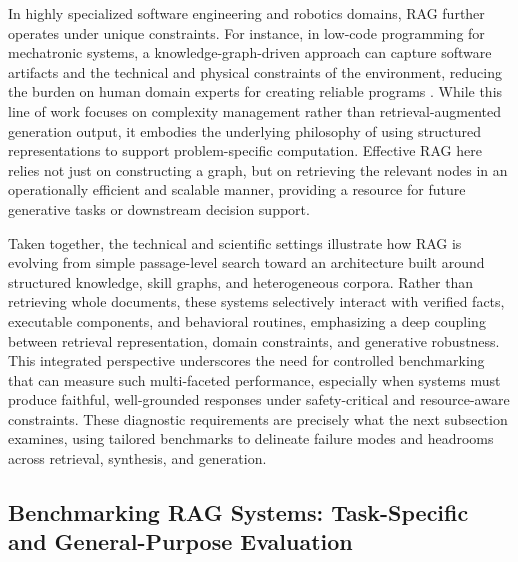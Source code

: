 \documentclass[11pt]{article}
\begin{document}
In highly specialized software engineering and robotics domains, RAG further operates under unique constraints. For instance, in low-code programming for mechatronic systems, a knowledge-graph-driven approach can capture software artifacts and the technical and physical constraints of the environment, reducing the burden on human domain experts for creating reliable programs \cite{ref210}. While this line of work focuses on complexity management rather than retrieval-augmented generation output, it embodies the underlying philosophy of using structured representations to support problem-specific computation. Effective RAG here relies not just on constructing a graph, but on retrieving the relevant nodes in an operationally efficient and scalable manner, providing a resource for future generative tasks or downstream decision support.

Taken together, the technical and scientific settings illustrate how RAG is evolving from simple passage-level search toward an architecture built around structured knowledge, skill graphs, and heterogeneous corpora. Rather than retrieving whole documents, these systems selectively interact with verified facts, executable components, and behavioral routines, emphasizing a deep coupling between retrieval representation, domain constraints, and generative robustness. This integrated perspective underscores the need for controlled benchmarking that can measure such multi-faceted performance, especially when systems must produce faithful, well-grounded responses under safety-critical and resource-aware constraints. These diagnostic requirements are precisely what the next subsection examines, using tailored benchmarks to delineate failure modes and headrooms across retrieval, synthesis, and generation.

\subsection{Benchmarking RAG Systems: Task-Specific and General-Purpose Evaluation}
\end{document}
